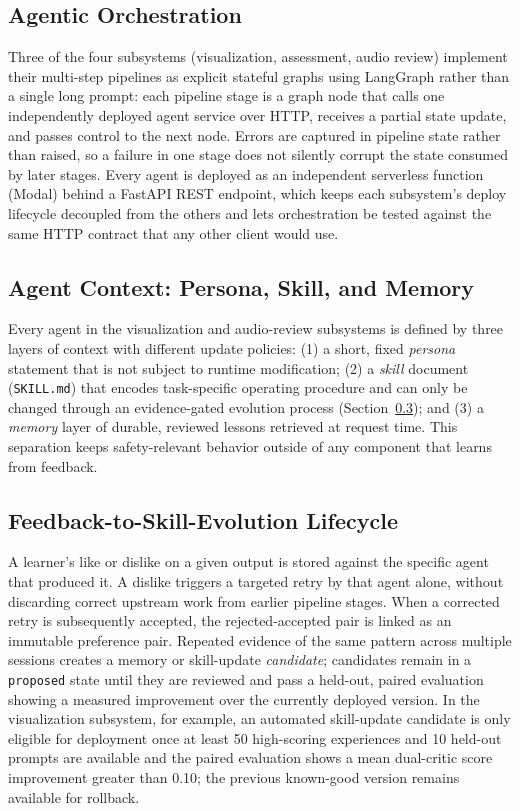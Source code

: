 \documentclass[conference]{IEEEtran}
\begin{document}
\subsection{Agentic Orchestration}

Three of the four subsystems (visualization, assessment, audio review) implement their multi-step pipelines as explicit stateful graphs using LangGraph \cite{langgraph} rather than a single long prompt: each pipeline stage is a graph node that calls one independently deployed agent service over HTTP, receives a partial state update, and passes control to the next node. Errors are captured in pipeline state rather than raised, so a failure in one stage does not silently corrupt the state consumed by later stages. Every agent is deployed as an independent serverless function (Modal) behind a FastAPI REST endpoint, which keeps each subsystem's deploy lifecycle decoupled from the others and lets orchestration be tested against the same HTTP contract that any other client would use.

\subsection{Agent Context: Persona, Skill, and Memory}

Every agent in the visualization and audio-review subsystems is defined by three layers of context with different update policies: (1) a short, fixed \emph{persona} statement that is not subject to runtime modification; (2) a \emph{skill} document (\texttt{SKILL.md}) that encodes task-specific operating procedure and can only be changed through an evidence-gated evolution process (Section~\ref{sec:lifecycle}); and (3) a \emph{memory} layer of durable, reviewed lessons retrieved at request time. This separation keeps safety-relevant behavior outside of any component that learns from feedback.

\subsection{Feedback-to-Skill-Evolution Lifecycle}
\label{sec:lifecycle}

A learner's like or dislike on a given output is stored against the specific agent that produced it. A dislike triggers a targeted retry by that agent alone, without discarding correct upstream work from earlier pipeline stages. When a corrected retry is subsequently accepted, the rejected-accepted pair is linked as an immutable preference pair. Repeated evidence of the same pattern across multiple sessions creates a memory or skill-update \emph{candidate}; candidates remain in a \texttt{proposed} state until they are reviewed and pass a held-out, paired evaluation showing a measured improvement over the currently deployed version. In the visualization subsystem, for example, an automated skill-update candidate is only eligible for deployment once at least 50 high-scoring experiences and 10 held-out prompts are available and the paired evaluation shows a mean dual-critic score improvement greater than 0.10; the previous known-good version remains available for rollback.
\end{document}
